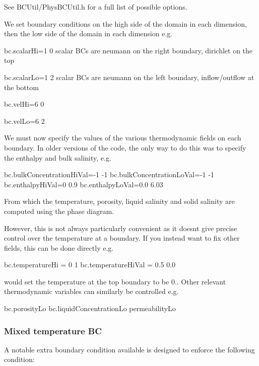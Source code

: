 See B\+C\+Util/\+Phys\+B\+C\+Util.\+h for a full list of possible options.

We set boundary conditions on the \textquotesingle{}high\textquotesingle{} side of the domain in each dimension, then the \textquotesingle{}low\textquotesingle{} side of the domain in each dimension e.\+g.

{\ttfamily bc.\+scalar\+Hi=1 0} scalar B\+Cs are neumann on the right boundary, dirichlet on the top

{\ttfamily bc.\+scalar\+Lo=1 2} scalar B\+Cs are neumann on the left boundary, inflow/outflow at the bottom

{\ttfamily bc.\+vel\+Hi=6 0}

{\ttfamily bc.\+vel\+Lo=6 2}

We must now specify the values of the various thermodynamic fields on each boundary. In older versions of the code, the only way to do this was to specify the enthalpy and bulk salinity, e.\+g.


\begin{DoxyCode}
bc.bulkConcentrationHiVal=-1 -1
bc.bulkConcentrationLoVal=-1 -1
bc.enthalpyHiVal=0 0.9
bc.enthalpyLoVal=0.0 6.03
\end{DoxyCode}


From which the temperature, porosity, liquid salinity and solid salinity are computed using the phase diagram.

However, this is not always particularly convenient as it doesn\textquotesingle{}t give precise control over the temperature at a boundary. If you instead want to fix other fields, this can be done directly e.\+g.


\begin{DoxyCode}
bc.temperatureHi = 0 1
bc.temperatureHiVal = 0.5 0.0
\end{DoxyCode}


would set the temperature at the top boundary to be 0.. Other relevant thermodynamic variables can similarly be controlled e.\+g.


\begin{DoxyCode}
bc.porosityLo
bc.liquidConcentrationLo
permeabilityLo
\end{DoxyCode}


\subsubsection*{Mixed temperature BC}

A notable extra boundary condition available is designed to enforce the following condition\+:


